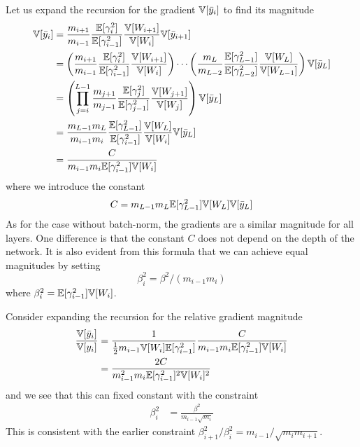 Let us expand the recursion for the gradient $\mathbb{V}[\bar{y}_{i}]$ to find its magnitude
\begin{align}
\mathbb{V}[\bar{y}_{i}]
& = \frac{m_{i+1}}{m_{i-1}} \frac{\mathbb{E}[\gamma_{i}^2]}{\mathbb{E}[\gamma_{i-1}^2]} \frac{\mathbb{V}[W_{i+1}]}{\mathbb{V}[W_{i}]} \mathbb{V}[\bar{y}_{i+1}] \\
& = \left( \frac{m_{i+1}}{m_{i-1}} \frac{\mathbb{E}[\gamma_{i}^2]}{\mathbb{E}[\gamma_{i-1}^2]} \frac{\mathbb{V}[W_{i+1}]}{\mathbb{V}[W_{i}]} \right) \cdots
  \left( \frac{m_{L}}{m_{L-2}} \frac{\mathbb{E}[\gamma_{L-1}^2]}{\mathbb{E}[\gamma_{L-2}^2]} \frac{\mathbb{V}[W_{L}]}{\mathbb{V}[W_{L-1}]} \right) \mathbb{V}[\bar{y}_{L}] \\
& = \left( \prod_{j = i}^{L-1} \frac{m_{j+1}}{m_{j-1}} \frac{\mathbb{E}[\gamma_{j}^2]}{\mathbb{E}[\gamma_{j-1}^2]} \frac{\mathbb{V}[W_{j+1}]}{\mathbb{V}[W_{j}]} \right) \mathbb{V}[\bar{y}_{L}] \\
& = \frac{m_{L-1} m_{L}}{m_{i-1} m_{i}} \frac{\mathbb{E}[\gamma_{L-1}^2]}{\mathbb{E}[\gamma_{i-1}^2]} \frac{\mathbb{V}[W_{L}]}{\mathbb{V}[W_{i}]} \mathbb{V}[\bar{y}_{L}] \\
& = \frac{C}{m_{i-1} m_{i} \mathbb{E}[\gamma_{i-1}^2] \mathbb{V}[W_{i}]}
\end{align}
where we introduce the constant
\begin{equation}
C = m_{L-1} m_{L} \mathbb{E}[\gamma_{L-1}^2] \mathbb{V}[W_{L}] \mathbb{V}[\bar{y}_{L}]
\end{equation}
As for the case without batch-norm, the gradients are a similar magnitude for all layers.
One difference is that the constant $C$ does not depend on the depth of the network.
It is also evident from this formula that we can achieve equal magnitudes by setting
\begin{equation}
\beta_{i}^2 = \beta^2 / (m_{i-1} m_{i})
\end{equation}
where $\beta_{i}^2 = \mathbb{E}[\gamma_{i-1}^2] \mathbb{V}[W_{i}]$.

Consider expanding the recursion for the relative gradient magnitude
\begin{align}
\frac{\mathbb{V}[\bar{y}_{i}]}{\mathbb{V}[y_{i}]}
& = \frac{1}{\tfrac{1}{2} m_{i-1} \mathbb{V}[W_{i}] \mathbb{E}[\gamma_{i-1}^2]} \frac{C}{m_{i-1} m_{i} \mathbb{E}[\gamma_{i-1}^2] \mathbb{V}[W_{i}]} \\
& = \frac{2 C}{m_{i-1}^2 m_{i} \mathbb{E}[\gamma_{i-1}^2]^2 \mathbb{V}[W_{i}]^2}
\end{align}
and we see that this can fixed constant with the constraint
\begin{align}
\beta_{i}^2 & = \frac{\beta^{2}}{m_{i-1} \sqrt{m_{i}}}
\end{align}
This is consistent with the earlier constraint $\beta_{i+1}^2 / \beta_{i}^2 = m_{i-1} / \sqrt{m_{i} m_{i+1}}$.

